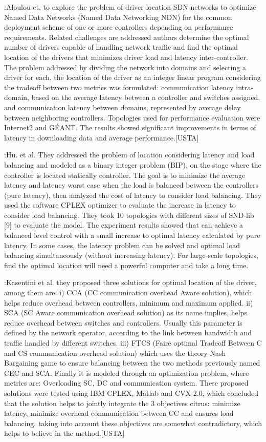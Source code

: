 \documentclass[a4paper,10pt]{article}
\begin{document}
\cite{AlAy17}:Aloulou et. to explore the problem of driver location SDN networks to optimize Named Data Networks (Named Data Networking NDN) for the common deployment scheme of one or more controllers depending on performance requirements. Related challenges are addressed authors determine the optimal number of drivers capable of handling network traffic and find the optimal location of the drivers that minimizes driver load and latency inter-controller.
The problem addressed by dividing the network into domains and selecting a driver for each. the location of the driver as an integer linear program considering the tradeoff between two metrics was formulated: communication latency intra-domain, based on the average latency between a controller and switches assigned, and communication latency between domains, represented by average delay between neighboring controllers. Topologies used for performance evaluation were Internet2 and GÉANT. The results showed significant improvements in terms of latency in downloading data and average performance.[USTA]

\cite{HuLu16}:Hu. et al. They addressed the problem of location considering latency and load balancing and modeled as a binary integer problem (BIP), on the stage where the controller is located statically controller. The goal is to minimize the average latency and latency worst case when the load is balanced between the controllers (pure latency), then analyzed the cost of latency to consider load balancing. They used the software CPLEX optimizer to evaluate the increase in latency to consider load balancing. They took 10 topologies with different sizes of SND-lib [9] to evaluate the model. The experiment results showed that can achieve a balanced level control with a small increase to optimal latency calculated by pure latency. In some cases, the latency problem can be solved and optimal load balancing simultaneously (without increasing latency). For large-scale topologies, find the optimal location will need a powerful computer and take a long time.

\cite{KsBa16}:Kasentini et al. they proposed three solutions for optimal location of the driver, among them are: i) CCA (CC communication overhead Aware solution), which helps reduce overhead between controllers, minimum and maximum applied. ii) SCA (SC Aware communication overhead solution) as its name implies, helps reduce overhead between switches and controllers. Usually this parameter is defined by the network operator, according to the link between bandwidth and traffic handled by different switches. iii) FTCS (Faire optimal Tradeoff Between C and CS communication overhead solution) which uses the theory Nash Bargaining game to ensure balancing between the two methods previously named CEC and SCA. Finally it is modeled through an optimization problem, where metrics are: Overloading SC, DC and communication system. These proposed solutions were tested using IBM CPLEX, Matlab and CVX 2.0, which concluded that the solution helps to jointly integrate the 3 objectives citrus: minimize latency, minimize overhead communication between CC and ensures load balancing, taking into account these objectives are somewhat contradictory, which helps to believe in the method.[USTA]
\end{document}
